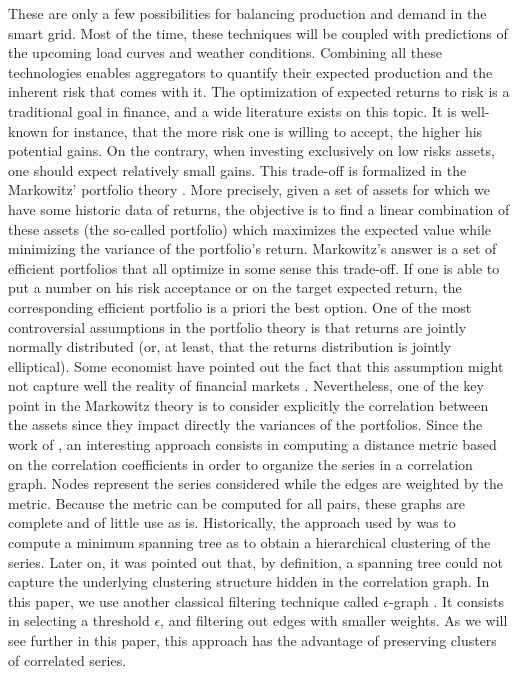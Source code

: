 \documentclass[journal]{IEEEtran}
\begin{document}
These are only a few possibilities for balancing production and demand in the smart grid. Most of the time, these techniques will be coupled with predictions of the upcoming load curves and weather conditions. Combining all these technologies enables aggregators to quantify their expected production and the inherent risk that comes with it. The optimization of expected returns to risk is a traditional goal in finance, and a wide literature exists on this topic. It is well-known for instance, that the more risk one is willing to accept, the higher his potential gains. On the contrary, when investing exclusively on low risks assets, one should expect relatively small gains. This trade-off is formalized in the Markowitz' portfolio theory \cite{Markowitz1959}. More precisely, given a set of assets for which we have some historic data of returns, the objective is to find a linear combination of these assets (the so-called portfolio) which maximizes the expected value while minimizing the variance of the portfolio's return. Markowitz's answer is a set of efficient portfolios that all optimize in some sense this trade-off. If one is able to put a number on his risk acceptance or on the target expected return, the corresponding efficient portfolio is a priori the best option. One of the most controversial assumptions in the portfolio theory is that returns are jointly normally distributed (or, at least, that the returns distribution is jointly elliptical). Some economist have pointed out the fact that this assumption might not capture well the reality of financial markets \cite{doi:10.1142/S0219024912500197}. Nevertheless, one of the key point in the Markowitz theory is to consider explicitly the correlation between the assets since they impact directly the variances of the portfolios. Since the work of \cite{Mantegna1999}, an interesting approach consists in computing a distance metric based on the correlation coefficients in order to organize the series in a correlation graph. Nodes represent the series considered while the edges are weighted by the metric. Because the metric can be computed for all pairs, these graphs are complete and of little use as is. Historically, the approach used by \cite{Mantegna1999} was to compute a minimum spanning tree as to obtain a hierarchical clustering of the series. Later on, it was pointed out that, by definition, a spanning tree could not capture the underlying clustering structure hidden in the correlation graph. In this paper, we use another classical filtering technique called $ \epsilon $-graph \cite{Garas2008}. It consists in selecting a threshold $ \epsilon $, and filtering out edges with smaller weights. As we will see further in this paper, this approach has the advantage of preserving clusters of correlated series.
\end{document}
